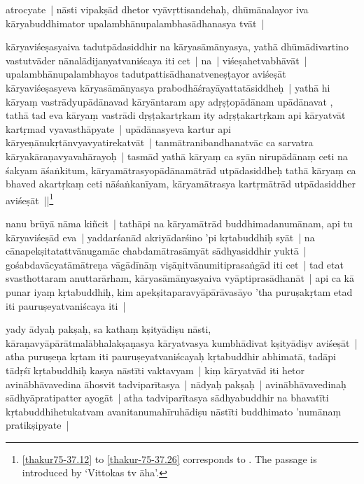 \documentclass[article,12pt,a4paper]{memoir}
\newcommand{\gap}[1]{}
\begin{document}
	  \pstart atrocyate | nāsti vipakṣād dhetor vyāvṛttisandehaḥ, dhūmānalayor iva kāryabuddhimator upalambhānupalambhasādhanasya tvāt |
	\pend
      

	  \pstart kāryaviśeṣasyaiva tadutpādasiddhir na kā\gap{}ryasāmānyasya, yathā dhūmādivartino vastutvāder nānalādijanyatvaniścaya iti cet | na | viśeṣahetvabhāvāt | upalambhānupalambhayos tadutpattisādhanatveneṣṭayor aviśeṣāt kāryaviśeṣasyeva kāryasāmānyasya prabodhāśrayāyattatāsiddheḥ |\label{rnā__97385} yathā hi kāryaṃ vastrādyupādānavad  kāryāntaram apy adṛṣṭopādānam upādānavat , tathā tad eva kāryaṃ vastrādi dṛṣṭakartṛkam ity adṛṣṭakartṛkam api kāryatvāt kartṛmad vyavasthāpyate | upādānasyeva kartur api kāryeṇānukṛtānvyavyatirekatvāt | tanmātranibandhanatvāc ca sarvatra kāryakāraṇavyavahārayoḥ | tasmād yathā kārya\leavevmode{}\label{RNAms_21b}ṃ ca syān nirupādānaṃ ceti na śakyam āśaṅkitum, kāryamātrasyopādānamātrād utpādasiddheḥ tathā kāryaṃ ca bhaved akartṛkaṃ ceti nāśaṅkanīyam, kāryamātrasya kartṛmātrād utpādasiddher aviśeṣāt ||\label{thakur-75-37.26}\footnote{\cref{thakur75-37.12} to \cref{thakur-75-37.26} corresponds to . The passage is introduced by ‘Vittokas tv āha’.}
	\pend
      

	  \pstart nanu brūyā nāma kiñcit | tathāpi na kāryamātrād buddhimadanumānam, api tu kāryaviśeṣād eva | yaddarśanād akriyādarśino 'pi kṛtabuddhiḥ syāt | na cānapekṣitatattvānugamāc chabdamātrasāmyāt sādhyasiddhir yuktā | gośabdavācyatāmātreṇa vāgādīnāṃ viṣāṇitvānumitiprasaṅgād iti cet | tad etat svasthottaram anuttarārham, kāryasāmānyasyaiva vyāptiprasādhanāt | api ca kā punar iyaṃ kṛtabuddhiḥ, kim apekṣitaparavyāpārāvasāyo 'tha puruṣakṛtam etad iti pauruṣeyatvaniścaya iti |
	\pend
      

	  \pstart yady ādyaḥ pakṣaḥ, sa kathaṃ kṣityādiṣu nāsti, kāraṇavyāpārātmalābhalakṣaṇasya kāryatvasya kumbhādivat kṣityādiṣv aviśeṣāt | atha puruṣeṇa kṛtam iti pauruṣeyatvaniścayaḥ kṛtabuddhir abhimatā, tadāpi tādṛśī kṛtabuddhiḥ kasya nāstīti vaktavyam | kiṃ kāryatvād iti hetor avinābhāvavedina āhosvit tadviparītasya | nādyaḥ pakṣaḥ | avinābhāvavedinaḥ sādhyāpratipatter ayogāt | atha tadviparītasya sādhyabuddhir na bhavatīti kṛtabuddhihetukatvam avanitanumahīruhādiṣu nāstīti buddhimato 'numānaṃ pratikṣipyate |
	\pend
      
\end{document}
